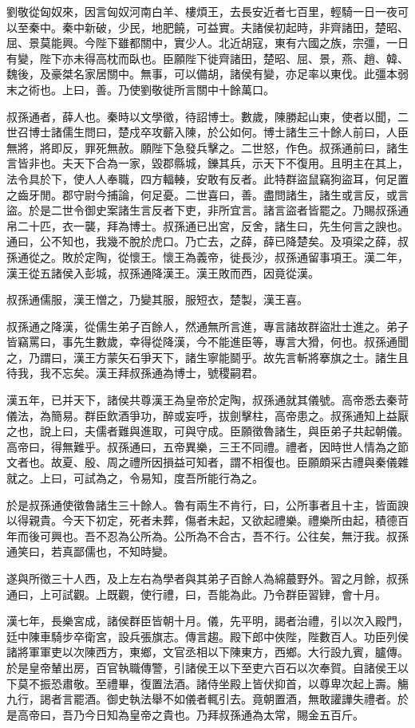 劉敬從匈奴來，因言匈奴河南白羊、樓煩王，去長安近者七百里，輕騎一日一夜可以至秦中。秦中新破，少民，地肥饒，可益實。夫諸侯初起時，非齊諸田，楚昭、屈、景莫能興。今陛下雖都關中，實少人。北近胡寇，東有六國之族，宗彊，一日有變，陛下亦未得高枕而臥也。臣願陛下徙齊諸田，楚昭、屈、景，燕、趙、韓、魏後，及豪桀名家居關中。無事，可以備胡，諸侯有變，亦足率以東伐。此彊本弱末之術也。上曰，善。乃使劉敬徙所言關中十餘萬口。

叔孫通者，薛人也。秦時以文學徵，待詔博士。數歲，陳勝起山東，使者以聞，二世召博士諸儒生問曰，楚戍卒攻蘄入陳，於公如何。博士諸生三十餘人前曰，人臣無將，將即反，罪死無赦。願陛下急發兵擊之。二世怒，作色。叔孫通前曰，諸生言皆非也。夫天下合為一家，毀郡縣城，鑠其兵，示天下不復用。且明主在其上，法令具於下，使人人奉職，四方輻輳，安敢有反者。此特群盜鼠竊狗盜耳，何足置之齒牙閒。郡守尉今捕論，何足憂。二世喜曰，善。盡問諸生，諸生或言反，或言盜。於是二世令御史案諸生言反者下吏，非所宜言。諸言盜者皆罷之。乃賜叔孫通帛二十匹，衣一襲，拜為博士。叔孫通已出宮，反舍，諸生曰，先生何言之諛也。通曰，公不知也，我幾不脫於虎口。乃亡去，之薛，薛已降楚矣。及項梁之薛，叔孫通從之。敗於定陶，從懷王。懷王為義帝，徙長沙，叔孫通留事項王。漢二年，漢王從五諸侯入彭城，叔孫通降漢王。漢王敗而西，因竟從漢。

叔孫通儒服，漢王憎之，乃變其服，服短衣，楚製，漢王喜。

叔孫通之降漢，從儒生弟子百餘人，然通無所言進，專言諸故群盜壯士進之。弟子皆竊罵曰，事先生數歲，幸得從降漢，今不能進臣等，專言大猾，何也。叔孫通聞之，乃謂曰，漢王方蒙矢石爭天下，諸生寧能鬬乎。故先言斬將搴旗之士。諸生且待我，我不忘矣。漢王拜叔孫通為博士，號稷嗣君。

漢五年，已并天下，諸侯共尊漢王為皇帝於定陶，叔孫通就其儀號。高帝悉去秦苛儀法，為簡易。群臣飲酒爭功，醉或妄呼，拔劍擊柱，高帝患之。叔孫通知上益厭之也，說上曰，夫儒者難與進取，可與守成。臣願徵魯諸生，與臣弟子共起朝儀。高帝曰，得無難乎。叔孫通曰，五帝異樂，三王不同禮。禮者，因時世人情為之節文者也。故夏、殷、周之禮所因損益可知者，謂不相復也。臣願頗采古禮與秦儀雜就之。上曰，可試為之，令易知，度吾所能行為之。

於是叔孫通使徵魯諸生三十餘人。魯有兩生不肯行，曰，公所事者且十主，皆面諛以得親貴。今天下初定，死者未葬，傷者未起，又欲起禮樂。禮樂所由起，積德百年而後可興也。吾不忍為公所為。公所為不合古，吾不行。公往矣，無汙我。叔孫通笑曰，若真鄙儒也，不知時變。

遂與所徵三十人西，及上左右為學者與其弟子百餘人為綿蕞野外。習之月餘，叔孫通曰，上可試觀。上既觀，使行禮，曰，吾能為此。乃令群臣習肄，會十月。

漢七年，長樂宮成，諸侯群臣皆朝十月。儀，先平明，謁者治禮，引以次入殿門，廷中陳車騎步卒衛宮，設兵張旗志。傳言趨。殿下郎中俠陛，陛數百人。功臣列侯諸將軍軍吏以次陳西方，東鄉，文官丞相以下陳東方，西鄉。大行設九賓，臚傳。於是皇帝輦出房，百官執職傳警，引諸侯王以下至吏六百石以次奉賀。自諸侯王以下莫不振恐肅敬。至禮畢，復置法酒。諸侍坐殿上皆伏抑首，以尊卑次起上壽。觴九行，謁者言罷酒。御史執法舉不如儀者輒引去。竟朝置酒，無敢讙譁失禮者。於是高帝曰，吾乃今日知為皇帝之貴也。乃拜叔孫通為太常，賜金五百斤。

